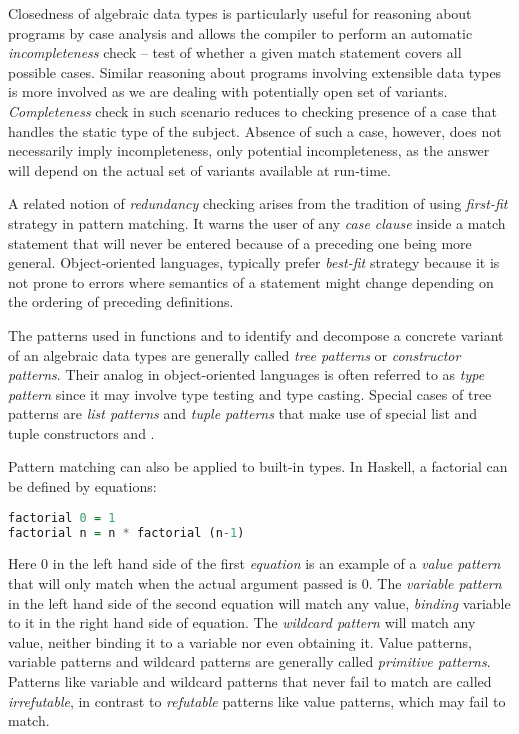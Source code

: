 Closedness of algebraic data types is particularly useful for reasoning about 
programs by case analysis and allows the compiler to perform an automatic 
\emph{incompleteness} check -- test of whether a given match statement 
covers all possible cases. Similar reasoning about programs involving extensible 
data types is more involved as we are dealing with potentially open set of 
variants. \emph{Completeness} check in such scenario reduces to checking presence 
of a case that handles the static type of the subject. Absence of such a case,
however, does not necessarily imply incompleteness, only potential incompleteness, 
as the answer will depend on the actual set of variants available at run-time.

A related notion of \emph{redundancy} checking arises from the 
tradition of using \emph{first-fit} strategy in pattern matching. It warns the 
user of any \emph{case clause} inside a match statement that will 
never be entered because of a preceding one being more general. Object-oriented 
languages, typically prefer \emph{best-fit} strategy because it is not prone 
to errors where semantics of a statement might change depending on the ordering 
of preceding definitions. 

The patterns used in functions  and  to 
identify and decompose a concrete variant of an algebraic data types are 
generally called \emph{tree patterns} or \emph{constructor patterns}. Their 
analog in object-oriented languages is often referred to as \emph{type pattern} 
since it may involve type testing and type casting. Special cases of tree patterns  
are \emph{list patterns} and \emph{tuple patterns} that make use of special list 
and tuple constructors \codehaskell{:} and .

Pattern matching can also be applied to built-in types.
In Haskell, a factorial can be defined by equations:

\begin{lstlisting}[language=Haskell]
factorial 0 = 1
factorial n = n * factorial (n-1)
\end{lstlisting}

\noindent
Here 0 in the left hand side of the first \emph{equation} is an example of a 
\emph{value pattern} that will only match when the actual argument passed is 0. 
The \emph{variable pattern}  in the left hand side of the second 
equation will match any value, \emph{binding} variable  to it in 
the right hand side of equation. The \emph{wildcard pattern} \codehaskell{_}  
will match any value, neither binding it to a variable nor even obtaining it. 
Value patterns, variable patterns and wildcard patterns are  
generally called \emph{primitive patterns}. Patterns like variable and wildcard 
patterns that never fail to match are called \emph{irrefutable}, in contrast to 
\emph{refutable} patterns like value patterns, which may fail to match.

